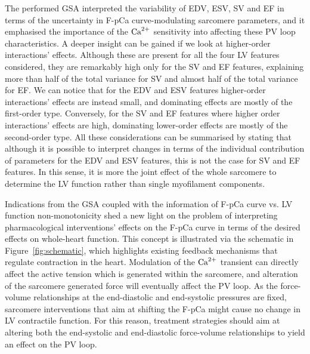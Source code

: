 The performed GSA interpreted the variability of EDV, ESV, SV and EF in terms of the uncertainty in F-pCa curve-modulating sarcomere parameters, and it emphasised the importance of the $\textrm{Ca}^{2+}$ sensitivity into affecting these PV loop characteristics. A deeper insight can be gained if we look at higher-order interactions' effects. Although these are present for all the four LV features considered, they are remarkably high only for the SV and EF features, explaining more than half of the total variance for SV and almost half of the total variance for EF. We can notice that for the EDV and ESV features higher-order interactions' effects are instead small, and dominating effects are mostly of the first-order type. Conversely, for the SV and EF features where higher order interactions' effects are high, dominating lower-order effects are mostly of the second-order type. All these considerations can be summarised by stating that although it is possible to interpret changes in terms of the individual contribution of parameters for the EDV and ESV features, this is not the case for SV and EF features. In this sense, it is more the joint effect of the whole sarcomere to determine the LV function rather than single myofilament components.

Indications from the GSA coupled with the information of F-pCa curve vs. LV function non-monotonicity shed a new light on the problem of interpreting pharmacological interventions' effects on the F-pCa curve in terms of the desired effects on whole-heart function. This concept is illustrated via the schematic in Figure~\ref{fig:schematic}, which highlights existing feedback mechanisms that regulate contraction in the heart. Modulation of the $\textrm{Ca}^{2+}$ transient can directly affect the active tension which is generated within the sarcomere, and alteration of the sarcomere generated force will eventually affect the PV loop. As the force-volume relationships at the end-diastolic and end-systolic pressures are fixed, sarcomere interventions that aim at shifting the F-pCa might cause no change in LV contractile function. For this reason, treatment strategies should aim at altering both the end-systolic and end-diastolic force-volume relationships to yield an effect on the PV loop.

